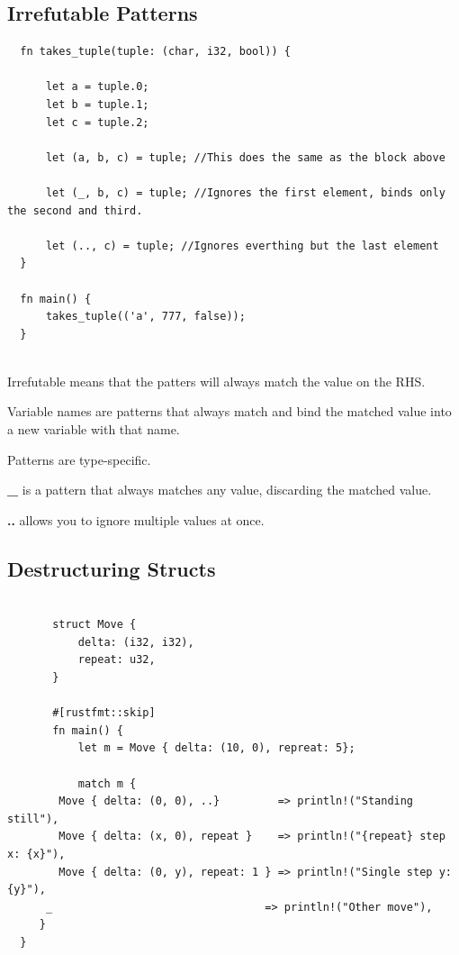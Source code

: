 \documentclass[11pt]{article}
\begin{document}
\subsection{Irrefutable Patterns}
\label{sec:org793d36f}

\begin{verbatim}
  fn takes_tuple(tuple: (char, i32, bool)) {
      
      let a = tuple.0;
      let b = tuple.1;
      let c = tuple.2;

      let (a, b, c) = tuple; //This does the same as the block above

      let (_, b, c) = tuple; //Ignores the first element, binds only the second and third.

      let (.., c) = tuple; //Ignores everthing but the last element
  }

  fn main() {
      takes_tuple(('a', 777, false));
  }


\end{verbatim}

Irrefutable means that the patters will always match the value on the RHS.

Variable names are patterns that always match and bind the matched value into a new variable with that name.

Patterns are type-specific.

\textbf{\_} is a pattern that always matches any value, discarding the matched value.

\textbf{..} allows you to ignore multiple values at once.
\subsection{Destructuring Structs}
\label{sec:org6b8e3af}

\begin{verbatim}

       struct Move {
           delta: (i32, i32),
           repeat: u32,
       }

       #[rustfmt::skip]
       fn main() {
           let m = Move { delta: (10, 0), repreat: 5};

           match m {
       	Move { delta: (0, 0), ..}         => println!("Standing still"),
       	Move { delta: (x, 0), repeat }    => println!("{repeat} step x: {x}"),
     	Move { delta: (0, y), repeat: 1 } => println!("Single step y: {y}"),
  	  _                                 => println!("Other move"),   
     }
  }

\end{verbatim}
\end{document}
